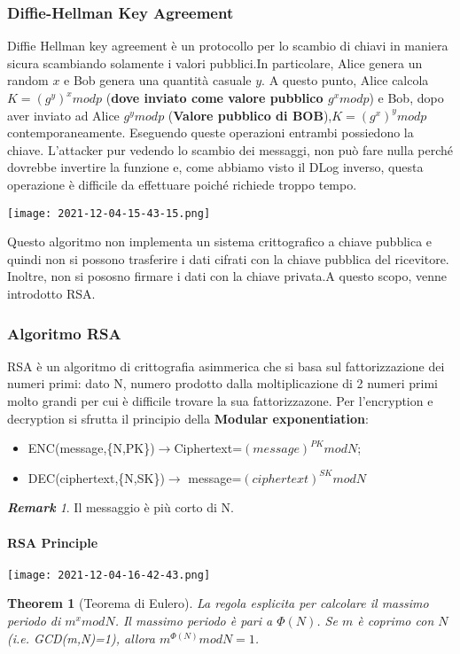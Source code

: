 \documentclass{article}
\newtheorem{theorem}{Theorem}[section]
\theoremstyle{remark}
\newtheorem*{remark}{\textbf{Remark}}
\begin{document}
\subsubsection{Diffie-Hellman Key Agreement}
Diffie Hellman key agreement è un protocollo per lo scambio di chiavi in maniera sicura scambiando solamente i valori pubblici.\newline In particolare, Alice genera un random \(x\) e Bob genera una quantità casuale \(y\). A questo punto, Alice calcola \(K=(g^y)^x mod p\) (\textbf{dove inviato come valore pubblico \(g^x modp\)}) e Bob, dopo aver inviato ad Alice \(g^y modp\) (\textbf{Valore pubblico di BOB}),\(K=(g^x)^y mod p\) contemporaneamente. Eseguendo queste operazioni entrambi possiedono la chiave. L'attacker pur vedendo lo scambio dei messaggi, non può fare nulla perché dovrebbe invertire la funzione e, come abbiamo visto il DLog inverso, questa operazione è difficile da effettuare poiché richiede troppo tempo.
\begin{center}
	\texttt{[image: 2021-12-04-15-43-15.png]}
\end{center}
Questo algoritmo non implementa un sistema crittografico a chiave pubblica e quindi non si possono trasferire i dati cifrati con la chiave pubblica del ricevitore. Inoltre, non si pososno firmare i dati con la chiave privata.\newline A questo scopo, venne introdotto RSA.
\subsubsection{Algoritmo RSA}
RSA è un algoritmo di crittografia asimmerica che si basa sul fattorizzazione dei numeri primi: dato N, numero prodotto dalla moltiplicazione di 2 numeri primi molto grandi per cui è difficile trovare la sua fattorizzazone.
Per l'encryption e decryption si sfrutta il principio della \textbf{Modular exponentiation}:\begin{itemize}
	\item ENC(message,\{N,PK\})\(\rightarrow\)Ciphertext=\((message)^{PK} mod N\);
	\item DEC(ciphertext,\{N,SK\})\(\rightarrow \) message=\((ciphertext)^{SK} mod N\)
\end{itemize}
\begin{remark}
	Il messaggio è più corto di N.
\end{remark}
\newpage
\paragraph{RSA Principle}
\begin{center}
	\texttt{[image: 2021-12-04-16-42-43.png]}
\end{center}
\begin{theorem}[Teorema di Eulero]
	La regola esplicita per calcolare il massimo periodo di \(m^x mod N\). Il massimo periodo è pari a \(\Phi(N)\). \newline Se \(m\) è coprimo con \(N\) (i.e. GCD(m,N)=1), allora \(m^{\Phi(N)} mod N = 1\).
\end{theorem}
\end{document}
